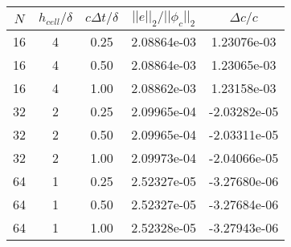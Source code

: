 \begin{tabular}{c|cccc}
\hline
 $N$ & $h_{cell}/\delta$ & $c\Delta t/\delta$ & $||e||_2/||\phi_c||_2$ &$\Delta c/c$\\
\hline
 16 & 4 & 0.25 & 2.08864e-03 & 1.23076e-03 \\
 16 & 4 & 0.50 & 2.08864e-03 & 1.23065e-03 \\
 16 & 4 & 1.00 & 2.08862e-03 & 1.23158e-03 \\
 32 & 2 & 0.25 & 2.09965e-04 & -2.03282e-05 \\
 32 & 2 & 0.50 & 2.09965e-04 & -2.03311e-05 \\
 32 & 2 & 1.00 & 2.09973e-04 & -2.04066e-05 \\
 64 & 1 & 0.25 & 2.52327e-05 & -3.27680e-06 \\
 64 & 1 & 0.50 & 2.52327e-05 & -3.27684e-06 \\
 64 & 1 & 1.00 & 2.52328e-05 & -3.27943e-06 \\
\hline
\end{tabular}
